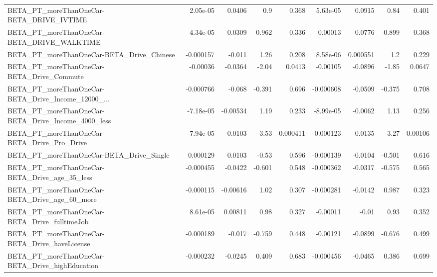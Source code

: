 \begin{tabular}{lrrrrrrrr}
BETA\_PT\_moreThanOneCar-BETA\_DRIVE\_IVTIME           &    2.05e-05 &       0.0406 &       0.9 &    0.368 &   5.63e-05 &      0.0915 &         0.84 &         0.401 \\
BETA\_PT\_moreThanOneCar-BETA\_DRIVE\_WALKTIME         &    4.34e-05 &       0.0309 &     0.962 &    0.336 &    0.00013 &      0.0776 &        0.899 &         0.368 \\
BETA\_PT\_moreThanOneCar-BETA\_Drive\_Chinese          &   -0.000157 &       -0.011 &      1.26 &    0.208 &   8.58e-06 &    0.000551 &          1.2 &         0.229 \\
BETA\_PT\_moreThanOneCar-BETA\_Drive\_Commute          &    -0.00036 &      -0.0364 &     -2.04 &   0.0413 &   -0.00105 &     -0.0896 &        -1.85 &        0.0647 \\
BETA\_PT\_moreThanOneCar-BETA\_Drive\_Income\_12000\_... &   -0.000766 &       -0.068 &    -0.391 &    0.696 &  -0.000608 &     -0.0509 &       -0.375 &         0.708 \\
BETA\_PT\_moreThanOneCar-BETA\_Drive\_Income\_4000\_less &   -7.18e-05 &     -0.00534 &      1.19 &    0.233 &  -8.99e-05 &     -0.0062 &         1.13 &         0.256 \\
BETA\_PT\_moreThanOneCar-BETA\_Drive\_Pro\_Drive        &   -7.94e-05 &      -0.0103 &     -3.53 & 0.000411 &  -0.000123 &     -0.0135 &        -3.27 &       0.00106 \\
BETA\_PT\_moreThanOneCar-BETA\_Drive\_Single           &    0.000129 &       0.0103 &     -0.53 &    0.596 &  -0.000139 &     -0.0104 &       -0.501 &         0.616 \\
BETA\_PT\_moreThanOneCar-BETA\_Drive\_age\_35\_less      &   -0.000455 &      -0.0422 &    -0.601 &    0.548 &  -0.000362 &     -0.0317 &       -0.575 &         0.565 \\
BETA\_PT\_moreThanOneCar-BETA\_Drive\_age\_60\_more      &   -0.000115 &     -0.00616 &      1.02 &    0.307 &  -0.000281 &     -0.0142 &        0.987 &         0.323 \\
BETA\_PT\_moreThanOneCar-BETA\_Drive\_fulltimeJob      &    8.61e-05 &      0.00811 &      0.98 &    0.327 &   -0.00011 &       -0.01 &         0.93 &         0.352 \\
BETA\_PT\_moreThanOneCar-BETA\_Drive\_haveLicense      &   -0.000189 &       -0.017 &    -0.759 &    0.448 &   -0.00121 &     -0.0899 &       -0.676 &         0.499 \\
BETA\_PT\_moreThanOneCar-BETA\_Drive\_highEducation    &   -0.000232 &      -0.0245 &     0.409 &    0.683 &  -0.000456 &     -0.0465 &        0.386 &         0.699 \\

\end{tabular}
